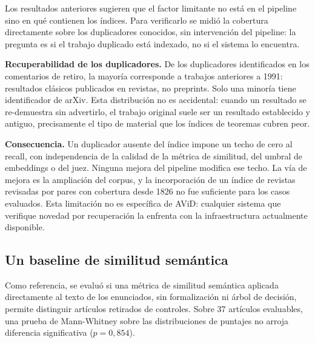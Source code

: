 \documentclass[12pt,a4paper]{article}
\theoremstyle{remark}
\begin{document}
Los resultados anteriores sugieren que el factor limitante no está en el pipeline sino en qué contienen los índices. Para verificarlo se midió la cobertura directamente sobre los duplicadores conocidos, sin intervención del pipeline: la pregunta es si el trabajo duplicado está indexado, no si el sistema lo encuentra.

\textbf{Recuperabilidad de los duplicadores.} De los duplicadores identificados en los comentarios de retiro, la mayoría corresponde a trabajos anteriores a 1991: resultados clásicos publicados en revistas, no preprints. Solo una minoría tiene identificador de arXiv. Esta distribución no es accidental: cuando un resultado se re-demuestra sin advertirlo, el trabajo original suele ser un resultado establecido y antiguo, precisamente el tipo de material que los índices de teoremas cubren peor.


\textbf{Consecuencia.} Un duplicador ausente del índice impone un techo de cero al recall, con independencia de la calidad de la métrica de similitud, del umbral de embeddings o del juez. Ninguna mejora del pipeline modifica ese techo. La vía de mejora es la ampliación del corpus, y la incorporación de un índice de revistas revisadas por pares con cobertura desde 1826 no fue suficiente para los casos evaluados. Esta limitación no es específica de AViD: cualquier sistema que verifique novedad por recuperación la enfrenta con la infraestructura actualmente disponible.

\subsection{Un baseline de similitud semántica}

Como referencia, se evaluó si una métrica de similitud semántica aplicada directamente al texto de los enunciados, sin formalización ni árbol de decisión, permite distinguir artículos retirados de controles. Sobre 37 artículos evaluables, una prueba de Mann-Whitney sobre las distribuciones de puntajes no arroja diferencia significativa ($p = 0{,}854$).
\end{document}
